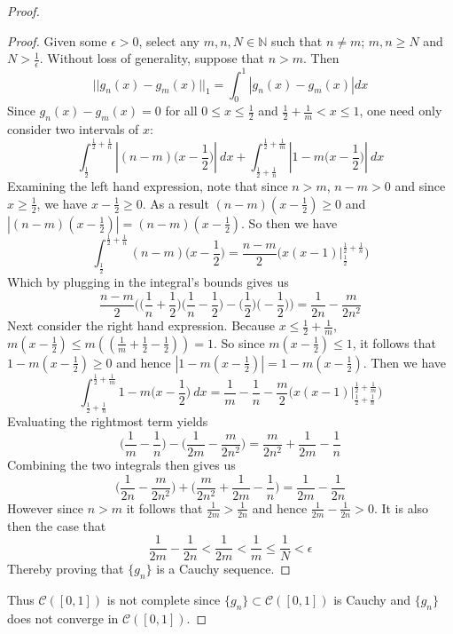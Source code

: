 \documentclass[12pt, letterpaper]{article}
\begin{document}
\begin{proof}
\begin{proof}
    Given some $\epsilon > 0$, select any $m, n, N \in \mathbb{N}$ such that $n \neq m$; $m, n \geq N$ and $N > \frac{1}{\epsilon}$. Without loss of generality, suppose that $n > m$. Then
    $$ ||g_n(x) - g_m(x)||_1 = \int_0^1 |g_n(x) - g_m(x)| dx$$
    Since $g_n(x) - g_m(x) = 0$ for all $0 \leq x \leq \frac{1}{2}$ and $\frac{1}{2} + \frac{1}{m} < x \leq 1$, one need only consider two intervals of $x$:
    $$ \int_\frac{1}{2}^{\frac{1}{2} + \frac{1}{n}}|(n-m)\Big(x-\frac{1}{2}\Big)| \ dx + \int_{\frac{1}{2} + \frac{1}{n}}^{\frac{1}{2} + \frac{1}{m}}| 1 - m\Big(x - \frac{1}{2}\Big)| \ dx$$
    Examining the left hand expression, note that since $n > m$, $n - m > 0$ and since $x \geq \frac{1}{2}$, we have $x - \frac{1}{2} \geq 0$. As a result $(n-m)(x-\frac{1}{2}) \geq 0$ and $|(n-m)(x-\frac{1}{2})| = (n-m)(x-\frac{1}{2})$. So then we have
    $$\int_\frac{1}{2}^{\frac{1}{2} + \frac{1}{n}}(n-m)\Big(x-\frac{1}{2}\Big) = \frac{n-m}{2}\Big(x(x - 1)\big|_\frac{1}{2}^{\frac{1}{2} + \frac{1}{n}}\Big)$$
    Which by plugging in the integral's bounds gives us
    $$ \frac{n-m}{2}\Big(\Big(\frac{1}{n} + \frac{1}{2}\Big)\Big(\frac{1}{n} - \frac{1}{2}\Big) - \Big(\frac{1}{2}\Big)\Big(-\frac{1}{2}\Big)\Big) = \frac{1}{2n} - \frac{m}{2n^2} $$
    Next consider the right hand expression. Because $x \leq \frac{1}{2} + \frac{1}{m}$, $m(x - \frac{1}{2}) \leq m((\frac{1}{m} + \frac{1}{2} - \frac{1}{2})) = 1$. So since $m(x - \frac{1}{2}) \leq 1$, it follows that $1 - m(x - \frac{1}{2}) \geq 0$ and hence $|1 - m(x - \frac{1}{2})| = 1 - m(x - \frac{1}{2})$. Then we have
    $$ \int_{\frac{1}{2} + \frac{1}{n}}^{\frac{1}{2} + \frac{1}{m}} 1 - m\Big(x - \frac{1}{2}\Big) \ dx = \frac{1}{m} - \frac{1}{n} - \frac{m}{2}\Big(x(x-1)\big|_{\frac{1}{2} + \frac{1}{n}}^{\frac{1}{2}+\frac{1}{m}}\Big) $$
    Evaluating the rightmost term yields
    $$ \Big(\frac{1}{m} - \frac{1}{n}\Big) - \Big(\frac{1}{2m} - \frac{m}{2n^2}\Big)  = \frac{m}{2n^2} + \frac{1}{2m} - \frac{1}{n} $$
    Combining the two integrals then gives us
    $$ \Big(\frac{1}{2n} - \frac{m}{2n^2}\Big) + \Big(\frac{m}{2n^2} + \frac{1}{2m} - \frac{1}{n}\Big) = \frac{1}{2m} - \frac{1}{2n} $$
    However since $n > m$ it follows that $\frac{1}{2m} > \frac{1}{2n}$ and hence $\frac{1}{2m} - \frac{1}{2n} > 0$. It is also then the case that
    $$ \frac{1}{2m} - \frac{1}{2n} < \frac{1}{2m} < \frac{1}{m} \leq \frac{1}{N} < \epsilon $$
    Thereby proving that $\{g_n\}$ is a Cauchy sequence.
  \end{proof}
  \noindent Thus $\mathcal{C}([0,1])$ is not complete since $\{g_n\} \subset \mathcal{C}([0,1])$ is Cauchy and $\{g_n\}$ does not converge in $\mathcal{C}([0,1])$.
\end{proof}
\end{document}
